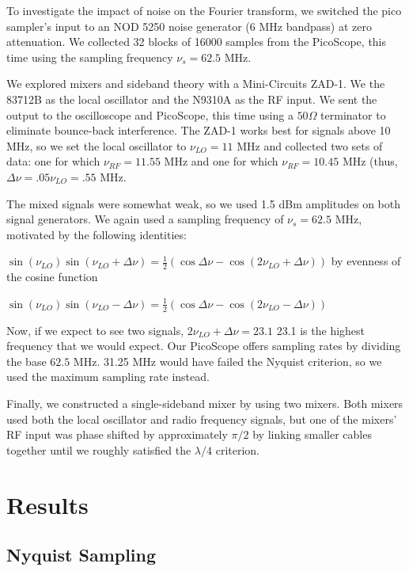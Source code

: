 \documentclass[a4paper]{article}
\begin{document}
To investigate the impact of noise on the Fourier transform, we switched the pico sampler's input to an NOD 5250 noise generator (6 MHz bandpass) at zero attenuation. We collected 32 blocks of 16000 samples from the PicoScope, this time using the sampling frequency $\nu_s = 62.5$ MHz.

We explored mixers and sideband theory with a Mini-Circuits ZAD-1. We the 83712B as the local oscillator and the N9310A as the RF input. We sent the output to the oscilloscope and PicoScope, this time using a $50 \Omega$ terminator to eliminate bounce-back interference. The ZAD-1 works best for signals above 10 MHz, so we set the local oscillator to $\nu_{LO} = 11$ MHz and collected two sets of data: one for which $\nu_{RF} = 11.55$ MHz and one for which $\nu_{RF}=10.45$ MHz (thus, $\Delta \nu = .05 \nu_{LO} = .55$ MHz. 

The mixed signals were somewhat weak, so we used 1.5 dBm amplitudes on both signal generators. We again used a sampling frequency of $\nu_s = 62.5$ MHz, motivated by the following identities:

$\sin(\nu_{LO}) \sin(\nu_{LO} + \Delta \nu) = \frac{1}{2} (\cos \Delta \nu - \cos (2\nu_{LO} + \Delta \nu))$ by evenness of the cosine function

$\sin(\nu_{LO}) \sin(\nu_{LO} - \Delta \nu) = \frac{1}{2} (\cos \Delta \nu - \cos (2\nu_{LO} - \Delta \nu))$

Now, if we expect to see two signals, $2\nu_{LO} + \Delta \nu = 23.1$ 23.1 is the highest frequency that we would expect. Our PicoScope offers sampling rates by dividing the base $62.5$ MHz. 31.25 MHz would have failed the Nyquist criterion, so we used the maximum sampling rate instead. 

Finally, we constructed a single-sideband mixer by using two mixers. Both mixers used both the local oscillator and radio frequency signals, but one of the mixers' RF input was phase shifted by approximately $\pi / 2$ by linking smaller cables together until we roughly satisfied the $\lambda / 4$ criterion.


\section{Results}

\subsection{Nyquist Sampling}
\end{document}
